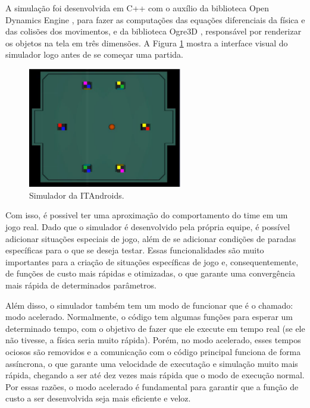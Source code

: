 \documentclass[10pt,fleqn,a4paper]{article}
\begin{document}
A simulação foi desenvolvida em C++ com o auxílio da biblioteca Open Dynamics Engine \cite{ODE}, para fazer as computações das equações diferenciais da física e das colisões dos movimentos, e da biblioteca Ogre3D \cite{Ogre}, responsável por renderizar os objetos na tela em três dimensões. A Figura \ref{fig:simulator} mostra a interface visual do simulador logo antes de se começar uma partida.

\begin{figure}[H]
	\centering
	\includegraphics[width=0.6\textwidth]{figures/SimulatorWithoutButtons.png}
	\caption{Simulador da ITAndroids.}
	\label{fig:simulator}
\end{figure}


Com isso, é possivel ter uma aproximação do comportamento do time em um jogo real. Dado que o simulador é desenvolvido pela própria equipe, é possível adicionar situações especiais de jogo, além de se adicionar condições de paradas específicas para o que se deseja testar. Essas funcionalidades são muito importantes para a criação de situações específicas de jogo e, consequentemente, de funções de custo mais rápidas e otimizadas, o que garante uma convergência mais rápida de determinados parâmetros.

Além disso, o simulador também tem um modo de funcionar que é o chamado: modo acelerado. Normalmente, o código tem algumas funções para esperar um determinado tempo, com o objetivo de fazer que ele execute em tempo real (se ele não tivesse, a física seria muito rápida). Porém, no modo acelerado, esses tempos ociosos são removidos e a comunicação com o código principal funciona de forma assíncrona, o que garante uma velocidade de executação e simulação muito mais rápida, chegando a ser até dez vezes mais rápida que o modo de execução normal. Por essas razões, o modo acelerado é fundamental para garantir que a função de custo a ser desenvolvida seja mais eficiente e veloz.
\end{document}
